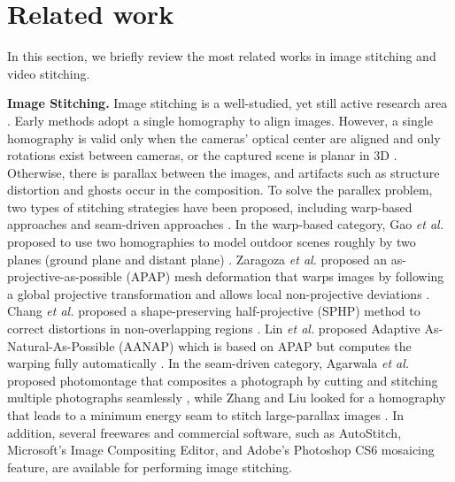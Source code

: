 \documentclass[conference]{IEEEtran}
\begin{document}
\section{Related work}
\label{sec:related}

In this section, we briefly review the most related works in image stitching and video stitching.


{\bf Image Stitching.} Image stitching is a well-studied, yet still active research 
area \cite{paragios2006handbook, brown2007automatic,hartley2003multiple,lin2011smoothly, chang2014shape, zaragoza2013projective,lin2015adaptive,zhang2014parallax, gao2013seam, agarwala2004interactive,gao2011constructing}. 
Early methods adopt a single homography to align images.
However, a single homography is valid only when the cameras' optical center are aligned and only rotations exist between cameras, or the captured scene is planar in 3D \cite{hartley2003multiple}. 
Otherwise, there is parallax between the images, and artifacts such as structure distortion and ghosts occur in the composition. 
To solve the parallex problem, two types of stitching strategies have been proposed, including warp-based approaches \cite{lin2011smoothly, chang2014shape, zaragoza2013projective} and seam-driven approaches \cite{zhang2014parallax, gao2013seam, agarwala2004interactive}. 
In the warp-based category, 
Gao \textit{et al.} proposed to use two homographies to model outdoor scenes roughly by two planes (ground plane and distant plane) \cite{gao2011constructing}.
Zaragoza \textit{et al.} proposed an as-projective-as-possible (APAP) mesh deformation that warps
images by following a global projective transformation and allows local non-projective 
deviations \cite{zaragoza2013projective}.
Chang \textit{et al.} proposed a shape-preserving half-projective (SPHP) method
to correct distortions in non-overlapping regions \cite{chang2014shape}. 
Lin \textit{et al.} proposed Adaptive As-Natural-As-Possible (AANAP) 
which is based on APAP but computes the warping fully automatically \cite{lin2015adaptive}.
In the seam-driven category, Agarwala \textit{et al.}
proposed photomontage that composites a photograph by
cutting and stitching multiple photographs seamlessly \cite{agarwala2004interactive},
while Zhang and Liu looked for a homography that leads to a
minimum energy seam to stitch large-parallax images \cite{zhang2014parallax}.
In addition, several freewares and commercial software, such as AutoStitch, Microsoft’s Image Compositing Editor, and Adobe's Photoshop CS6 mosaicing feature, are available for performing image stitching.
\end{document}
